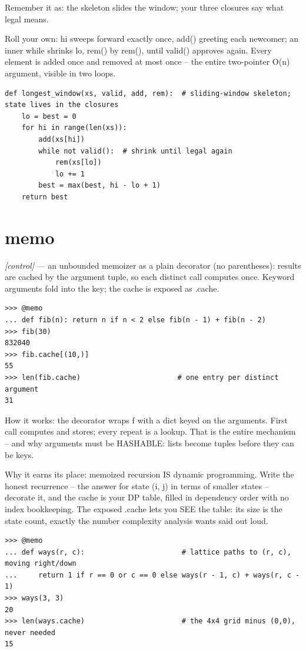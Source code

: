 \documentclass[11pt,letterpaper]{book}
\begin{document}
Remember it as: the skeleton slides the window; your three closures say what legal means.


Roll your own: hi sweeps forward exactly once, add() greeting each newcomer; an inner while shrinks lo, rem() by rem(), until valid() approves again. Every element is added once and removed at most once -- the entire two-pointer O(n) argument, visible in two loops.

\begin{lstlisting}[style=code]
def longest_window(xs, valid, add, rem):  # sliding-window skeleton; state lives in the closures
    lo = best = 0
    for hi in range(len(xs)):
        add(xs[hi])
        while not valid():  # shrink until legal again
            rem(xs[lo])
            lo += 1
        best = max(best, hi - lo + 1)
    return best
\end{lstlisting}

\section{memo}
\noindent\textit{[control]} --- an unbounded memoizer as a plain decorator (no parentheses): results are cached by the argument tuple, so each distinct call computes once. Keyword arguments fold into the key; the cache is exposed as .cache.
\begin{lstlisting}[style=spec]
>>> @memo
... def fib(n): return n if n < 2 else fib(n - 1) + fib(n - 2)
>>> fib(30)
832040
>>> fib.cache[(10,)]
55
>>> len(fib.cache)                       # one entry per distinct argument
31
\end{lstlisting}

How it works: the decorator wraps f with a dict keyed on the arguments. First call computes and stores; every repeat is a lookup. That is the entire mechanism -- and why arguments must be HASHABLE: lists become tuples before they can be keys.


Why it earns its place: memoized recursion IS dynamic programming. Write the honest recurrence -- the answer for state (i, j) in terms of smaller states -- decorate it, and the cache is your DP table, filled in dependency order with no index bookkeeping. The exposed .cache lets you SEE the table: its size is the state count, exactly the number complexity analysis wants said out loud.

\begin{lstlisting}[style=spec]
>>> @memo
... def ways(r, c):                       # lattice paths to (r, c), moving right/down
...     return 1 if r == 0 or c == 0 else ways(r - 1, c) + ways(r, c - 1)
>>> ways(3, 3)
20
>>> len(ways.cache)                       # the 4x4 grid minus (0,0), never needed
15
\end{lstlisting}
\end{document}
